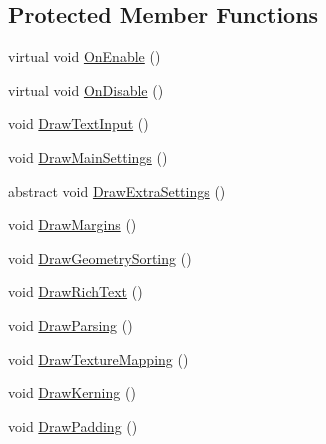 \subsection*{Protected Member Functions}
\begin{DoxyCompactItemize}
\item 
virtual void \mbox{\hyperlink{class_t_m_pro_1_1_editor_utilities_1_1_t_m_p___base_editor_panel_a3a60309b317f09709852e0c8013e6849}{On\+Enable}} ()
\item 
virtual void \mbox{\hyperlink{class_t_m_pro_1_1_editor_utilities_1_1_t_m_p___base_editor_panel_aef86582a22c23f9a5dd2236eb704aac7}{On\+Disable}} ()
\item 
void \mbox{\hyperlink{class_t_m_pro_1_1_editor_utilities_1_1_t_m_p___base_editor_panel_acf5601a4296e177f9aa0cc74b3556fee}{Draw\+Text\+Input}} ()
\item 
void \mbox{\hyperlink{class_t_m_pro_1_1_editor_utilities_1_1_t_m_p___base_editor_panel_a4c8d796ceaf88f408b52ef25e81cb117}{Draw\+Main\+Settings}} ()
\item 
abstract void \mbox{\hyperlink{class_t_m_pro_1_1_editor_utilities_1_1_t_m_p___base_editor_panel_aa48733f64d72c29f30e9533061f0c962}{Draw\+Extra\+Settings}} ()
\item 
void \mbox{\hyperlink{class_t_m_pro_1_1_editor_utilities_1_1_t_m_p___base_editor_panel_abbf85a27920dd905ebe05c05c8bc0af8}{Draw\+Margins}} ()
\item 
void \mbox{\hyperlink{class_t_m_pro_1_1_editor_utilities_1_1_t_m_p___base_editor_panel_a585170858dbbb92e0e09828c06798fc0}{Draw\+Geometry\+Sorting}} ()
\item 
void \mbox{\hyperlink{class_t_m_pro_1_1_editor_utilities_1_1_t_m_p___base_editor_panel_ab0c714c3b42cc58446443353f51f54c5}{Draw\+Rich\+Text}} ()
\item 
void \mbox{\hyperlink{class_t_m_pro_1_1_editor_utilities_1_1_t_m_p___base_editor_panel_a26fbb356584983194be6c3251088d033}{Draw\+Parsing}} ()
\item 
void \mbox{\hyperlink{class_t_m_pro_1_1_editor_utilities_1_1_t_m_p___base_editor_panel_abaaa184b10796d9ad95d43b80b1ca614}{Draw\+Texture\+Mapping}} ()
\item 
void \mbox{\hyperlink{class_t_m_pro_1_1_editor_utilities_1_1_t_m_p___base_editor_panel_a7a801b12cf3a9d08b0a2c19e450b3713}{Draw\+Kerning}} ()
\item 
void \mbox{\hyperlink{class_t_m_pro_1_1_editor_utilities_1_1_t_m_p___base_editor_panel_ac66e725c1c635a3c2c301bc3f741f8b8}{Draw\+Padding}} ()
\item 

\end{DoxyCompactItemize}
